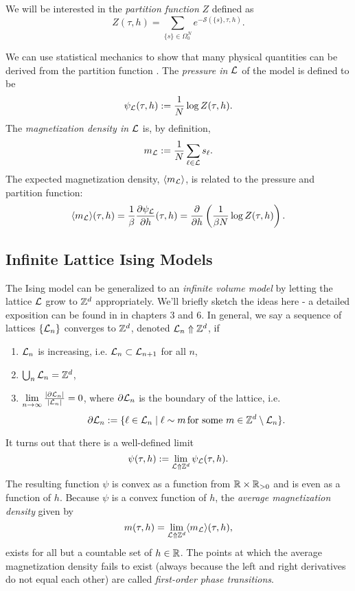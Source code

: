 \documentclass[11pt,reqno]{amsart}
\numberwithin{equation}{section}
\begin{document}
	We will be interested in the \emph{partition function} $Z$ defined as \[Z(\tau,h)=\sum_{\{s\}\in\Omega_0^N}e^{-\mathcal{S}(\{s\},\tau, h)}. \]
	
	We can use statistical mechanics to show that many physical quantities can be derived from the partition function \cite[Ch. 3]{friedli_velenik_2017}.
	The \emph{pressure in $\mathcal{L}$} of the model is defined to be 
	\[\psi_{\mathcal{L}}(\tau,h):=\frac{1}{N} \log Z(\tau,h).  \]
	The \emph{magnetization density in $\mathcal{L}$} is, by definition,
	\[ m_{\mathcal{L}}:=\frac{1}{N}\sum_{\ell \in \mathcal{L}} s_\ell. \]
	The expected magnetization density, $\langle m_{\mathcal{L}} \rangle$, is related to the pressure and partition function:
	\[\langle m_{\mathcal{L}} \rangle (\tau,h) = \frac{1}{\beta}\frac{\partial \psi_{\mathcal{L}}}{\partial h}(\tau, h)=\frac{\partial}{\partial h}\left( \frac{1}{\beta N} \log Z(\tau,h)\right) . \]
	
	
	\subsection{Infinite Lattice Ising Models}
	
	The Ising model can be generalized to an \emph{infinite volume model} by letting the lattice $\mathcal{L}$ grow to $\mathbb{Z}^d$ appropriately. 
	We'll briefly sketch the ideas here - a detailed exposition can be found in \cite{friedli_velenik_2017} in chapters 3 and 6.
	In general, we say a sequence of lattices $\{\mathcal{L}_n \}$ converges to $\mathbb{Z}^d$, denoted $\mathcal{L}_n \Uparrow \mathbb{Z}^d$, if 
	\begin{enumerate}
		\item $\mathcal{L}_n$ is increasing, i.e. $\mathcal{L}_n \subset \mathcal{L}_{n+1}$ for all $n$,
		\item $\bigcup_{n} \mathcal{L}_n = \mathbb{Z}^d$,
		\item $\lim\limits_{n\to \infty} \frac{|\partial \mathcal{L}_n|}{|\mathcal{L}_n|}=0$, where $\partial \mathcal{L}_n$ is the boundary of the lattice, i.e. 
		\[\partial \mathcal{L}_n := \{\ell \in \mathcal{L}_n \mid \ell \sim m \, \text{for some $m$}\in \mathbb{Z}^d \setminus \mathcal{L}_n \}. \]
	\end{enumerate}
	It turns out that there is a well-defined limit 
		\[\psi(\tau,h):= \lim\limits_{\mathcal{L} \Uparrow \mathbb{Z}^d} \psi_{\mathcal{L}}(\tau,h).\]
	The resulting function $\psi$ is convex as a function from $\mathbb{R} \times \mathbb{R}_{>0}$ and is even as a function of $h$.
	Because $\psi$ is a convex function of $h$, the \emph{average magnetization density} given by
		\[m(\tau,h)=\lim_{\mathcal{L} \Uparrow \mathbb{Z}^d} \langle m_{\mathcal{L}} \rangle (\tau, h), \]
	exists for all but a countable set of $h \in \mathbb{R}$.
	The points at which the average magnetization density fails to exist (always because the left and right derivatives do not equal each other) are called \emph{first-order phase transitions}.
		
\end{document}
